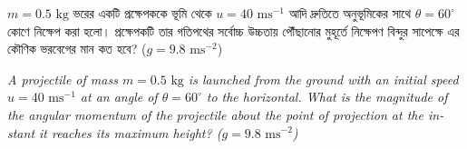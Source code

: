 \documentclass[12pt, a4paper]{article}
\begin{document}
\begin{tcolorbox}[questionbox={প্রশ্ন (Question) 43}]
\noindent
$m = 0.5\text{ kg}$ ভরের একটি প্রক্ষেপককে ভূমি থেকে $u = 40\text{ ms}^{-1}$ আদি দ্রুতিতে অনুভূমিকের সাথে $\theta = 60^\circ$ কোণে নিক্ষেপ করা হলো। প্রক্ষেপকটি তার গতিপথের সর্বোচ্চ উচ্চতায় পৌঁছানোর মুহূর্তে নিক্ষেপণ বিন্দুর সাপেক্ষে এর কৌণিক ভরবেগের মান কত হবে? ($g = 9.8\text{ ms}^{-2}$)

\vspace{0.8em}
\begin{english}
\noindent\textit{\color{darkgray}
A projectile of mass $m = 0.5\text{ kg}$ is launched from the ground with an initial speed $u = 40\text{ ms}^{-1}$ at an angle of $\theta = 60^\circ$ to the horizontal. What is the magnitude of the angular momentum of the projectile about the point of projection at the instant it reaches its maximum height? ($g = 9.8\text{ ms}^{-2}$)
}
\end{english}
\end{tcolorbox}
\end{document}
